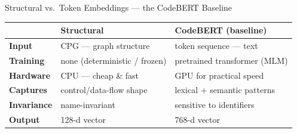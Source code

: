 \documentclass[aspectratio=169,10pt]{beamer}
\begin{document}
\begin{frame}[fragile]{Structural vs.\ Token Embeddings --- the CodeBERT Baseline}
  \vspace{0.12cm}
  \begin{center}
  {\scriptsize
  \renewcommand{\arraystretch}{1.25}
  \setlength{\tabcolsep}{6pt}
  \begin{tabular}{l l l}
    \toprule
     & \cellcolor{ccpg!12}\textbf{\textcolor{ccpg!60!black}{Structural}}
     & \cellcolor{c5!12}\textbf{\textcolor{c5!70!black}{CodeBERT (baseline)}} \\
    \midrule
    \textbf{Input}      & CPG --- graph structure       & token sequence --- text \\
    \textbf{Training}   & none (deterministic / frozen) & pretrained transformer (MLM) \\
    \textbf{Hardware}   & CPU --- cheap \& fast         & GPU for practical speed \\
    \textbf{Captures}   & control/data-flow shape       & lexical + semantic patterns \\
    \textbf{Invariance} & name-invariant                & sensitive to identifiers \\
    \textbf{Output}     & 128-d vector                  & 768-d vector \\
    \bottomrule
  \end{tabular}}
  \end{center}

\end{frame}
\end{document}
